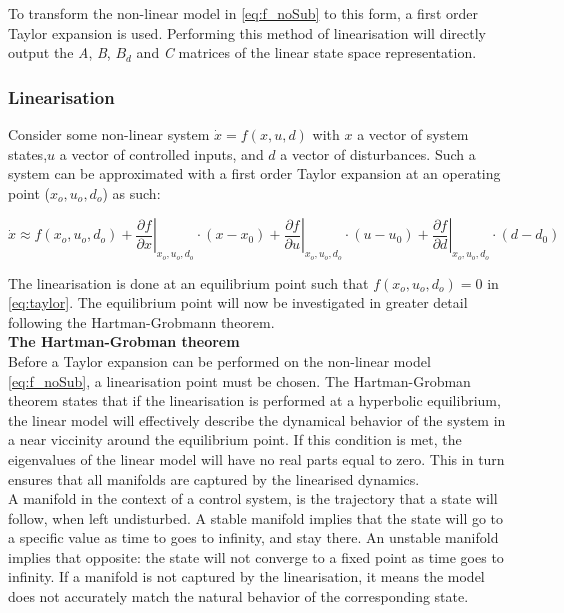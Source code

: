 To transform the non-linear model in \cref{eq:f_noSub} to this form, a first order Taylor expansion is used. Performing this method of linearisation will directly output the \textit{A}, \textit{B}, \textit{$B_d$} and \textit{C} matrices of the linear state space representation.

\subsubsection{Linearisation}
Consider some non-linear system $\dot{x} = f(x,u,d)$ with $ x $ a vector of system states,$  u $ a vector of controlled inputs, and $ d $ a vector of disturbances. Such a system can be approximated with a first order Taylor expansion at an operating point ($x_o, u_o, d_o$) as such:

\begin{equation} \label{eq:taylor}
	\dot{x}   \approx   f(x_o, u_o, d_o)   +
	\left. \dfrac{\partial f}{\partial x} \right |_{x_o, u_o, d_o} \cdot (x-x_0) +
	\left. \dfrac{\partial f}{\partial u} \right |_{x_o, u_o, d_o} \cdot (u-u_0) +
	\left. \dfrac{\partial f}{\partial d} \right |_{x_o, u_o, d_o} \cdot (d-d_0)
\end{equation}

The linearisation is done at an equilibrium point such that $f(x_o, u_o, d_o) = 0$ in \cref{eq:taylor}. The equilibrium point will now be investigated in greater detail following the Hartman-Grobmann theorem.\\

\textbf{The Hartman-Grobman theorem}\\
Before a Taylor expansion can be performed on the non-linear model \cref{eq:f_noSub}, a linearisation point must be chosen. The Hartman-Grobman theorem states that if the linearisation is performed at a hyperbolic equilibrium, the linear model will effectively describe the dynamical behavior of the system in a near viccinity around the equilibrium point. If this condition is met, the eigenvalues of the linear model will have no real parts equal to zero. This in turn ensures that all manifolds are captured by the linearised dynamics. \\
A manifold in the context of a control system, is the trajectory that a state will follow, when left undisturbed. A stable manifold implies that the state will go to a specific value as time to goes to infinity, and stay there. An unstable manifold implies that opposite: the state will not converge to a fixed point as time goes to infinity. If a manifold is not captured by the linearisation, it means the model does not accurately match the natural behavior of the corresponding state.\\

